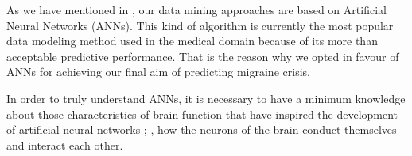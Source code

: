 \label{chapter:nn}

As we have mentioned in , our data mining approaches are based on Artificial Neural Networks (ANNs).
This kind of algorithm is currently the most popular data modeling method used in the medical domain because of its more than acceptable predictive performance. That is the reason why we opted in favour of ANNs for achieving  our final aim of predicting migraine crisis. 

In order to truly understand ANNs, it is necessary to have a minimum knowledge about those characteristics of brain function that have inspired the development of artificial neural networks
; \ie, how the neurons of the brain conduct themselves and interact each other.

